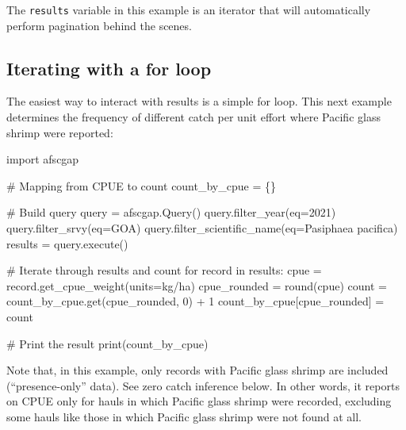 \documentclass[
  letterpaper,
  oneside,
  open=any]{scrbook}
\newenvironment{Shaded}{\begin{snugshade}}{\end{snugshade}}
\newcommand{\AttributeTok}[1]{\textcolor[rgb]{0.40,0.45,0.13}{#1}}
\newcommand{\CommentTok}[1]{\textcolor[rgb]{0.37,0.37,0.37}{#1}}
\newcommand{\ControlFlowTok}[1]{\textcolor[rgb]{0.00,0.23,0.31}{#1}}
\newcommand{\DecValTok}[1]{\textcolor[rgb]{0.68,0.00,0.00}{#1}}
\newcommand{\FunctionTok}[1]{\textcolor[rgb]{0.28,0.35,0.67}{#1}}
\newcommand{\NormalTok}[1]{\textcolor[rgb]{0.00,0.23,0.31}{#1}}
\newcommand{\OtherTok}[1]{\textcolor[rgb]{0.00,0.23,0.31}{#1}}
\newcommand{\SpecialCharTok}[1]{\textcolor[rgb]{0.37,0.37,0.37}{#1}}
\newcommand{\StringTok}[1]{\textcolor[rgb]{0.13,0.47,0.30}{#1}}
\begin{document}
The \texttt{results} variable in this example is an iterator that will
automatically perform pagination behind the scenes.

\subsection{Iterating with a for loop}\label{iterating-with-a-for-loop}

The easiest way to interact with results is a simple for loop. This next
example determines the frequency of different catch per unit effort
where Pacific glass shrimp were reported:

\begin{Shaded}
\begin{Highlighting}[]
\NormalTok{import afscgap}

\CommentTok{\# Mapping from CPUE to count}
\NormalTok{count\_by\_cpue }\OtherTok{=}\NormalTok{ \{\}}

\CommentTok{\# Build query}
\NormalTok{query }\OtherTok{=} \FunctionTok{afscgap.Query}\NormalTok{()}
\FunctionTok{query.filter\_year}\NormalTok{(}\AttributeTok{eq=}\DecValTok{2021}\NormalTok{)}
\FunctionTok{query.filter\_srvy}\NormalTok{(}\AttributeTok{eq=}\StringTok{\textquotesingle{}GOA\textquotesingle{}}\NormalTok{)}
\FunctionTok{query.filter\_scientific\_name}\NormalTok{(}\AttributeTok{eq=}\StringTok{\textquotesingle{}Pasiphaea pacifica\textquotesingle{}}\NormalTok{)}
\NormalTok{results }\OtherTok{=} \FunctionTok{query.execute}\NormalTok{()}

\CommentTok{\# Iterate through results and count}
\ControlFlowTok{for}\NormalTok{ record }\ControlFlowTok{in}\NormalTok{ results}\SpecialCharTok{:}
\NormalTok{  cpue }\OtherTok{=} \FunctionTok{record.get\_cpue\_weight}\NormalTok{(}\AttributeTok{units=}\StringTok{\textquotesingle{}kg/ha\textquotesingle{}}\NormalTok{)}
\NormalTok{  cpue\_rounded }\OtherTok{=} \FunctionTok{round}\NormalTok{(cpue)}
\NormalTok{  count }\OtherTok{=} \FunctionTok{count\_by\_cpue.get}\NormalTok{(cpue\_rounded, }\DecValTok{0}\NormalTok{) }\SpecialCharTok{+} \DecValTok{1}
\NormalTok{  count\_by\_cpue[cpue\_rounded] }\OtherTok{=}\NormalTok{ count}

\CommentTok{\# Print the result}
\FunctionTok{print}\NormalTok{(count\_by\_cpue)}
\end{Highlighting}
\end{Shaded}

Note that, in this example, only records with Pacific glass shrimp are
included (``presence-only'' data). See zero catch inference below. In
other words, it reports on CPUE only for hauls in which Pacific glass
shrimp were recorded, excluding some hauls like those in which Pacific
glass shrimp were not found at all.
\end{document}
